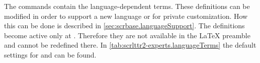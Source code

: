\begin{Declaration}
\end{Declaration}
The commands contain the language-dependent terms. These definitions can be
modified in order to support a new language or for private customization.
How this can be done is described in
\autoref{sec:scrbase.languageSupport}. The definitions become active only at
.  Therefore they are not available in the
{\LaTeX} preamble and cannot be redefined there. In
\autoref{tab:scrlttr2-experts.languageTerms} the default settings for
 and  can be found.%
%
